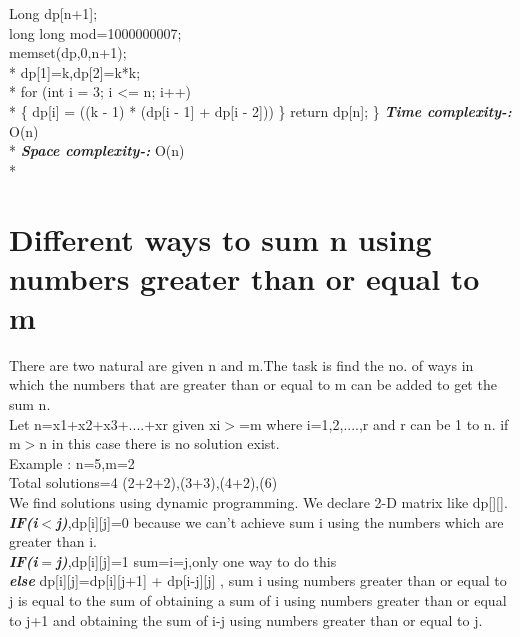 \documentclass[12pt]{book}
\begin{document}
\hspace{1cm}Long dp[n+1];\\ 
\hspace{1cm}long long mod=1000000007;\\ 
\hspace{1cm}memset(dp,0,n+1);\\*
\hspace{1cm}dp[1]=k,dp[2]=k*k;\\*
\hspace{1cm}for (int i = 3; i <= n; i++) \\*
\hspace{1cm}\{
    \newline
\hspace{1cm}\hspace{1cm}dp[i] = ((k - 1) * (dp[i - 1] + dp[i - 2])) %
    \newline
\hspace{1cm}\}
    \newline
\hspace{1cm}return dp[n];
    \newline
\}
\newline
\textbf{\textit{Time complexity-:}}
O(n)\\*
\newline
\textbf{\textit{Space complexity-:}}
O(n)\\*

\chapter{Different ways to sum n using numbers greater than or equal to m
}
There are two natural are given n and m.The task is find the no. of ways in which the numbers that are greater than or equal to m can be added to get the sum n.\\
\newline
Let  n=x1+x2+x3+....+xr   given xi$>$=m where i={1,2,....,r}
and r can be 1 to n.
if m$>$n in this case there is no solution exist.\\
Example :  n=5,m=2\\
Total solutions=4 {(2+2+2),(3+3),(4+2),(6)}\\
We find solutions using dynamic programming. We declare 2-D matrix like dp[][].\\
\textbf{\textit{IF(i$<$j)}},dp[i][j]=0 because we can’t achieve sum i using the numbers which are greater than i.\\
\textbf{\textit{IF(i$=$j)}},dp[i][j]=1 sum=i=j,only one way to do this\\
\textbf{\textit{else}} dp[i][j]=dp[i][j+1] + dp[i-j][j] , sum i using numbers greater than or equal to j is equal to the sum of obtaining a sum of i using numbers greater than or equal to j+1 and obtaining the sum of i-j using numbers greater than or equal to j.\\
\end{document}
